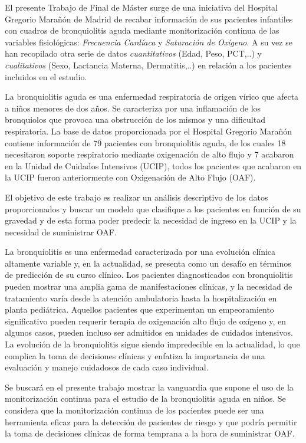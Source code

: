\documentclass[a4paper, 11pt, spanish, twoside]{article}
\begin{document}
El presente Trabajo de Final de Máster surge de una iniciativa del Hospital Gregorio Marañón de Madrid de recabar información de sus pacientes infantiles con cuadros de bronquiolitis aguda mediante monitorización continua de las variables fisiológicas: \textit{Frecuencia Cardíaca} y \textit{Saturación de Oxígeno}. A su vez se han recopilado otra serie de datos \textit{cuantitativos} (Edad, Peso, PCT,..) y \textit{cualitativos} (Sexo, Lactancia Materna, Dermatitis,..) en relación a los pacientes incluidos en el estudio. 

La bronquiolitis aguda es una enfermedad respiratoria de origen vírico que afecta a niños menores de dos años. Se caracteriza por una inflamación de los bronquiolos que provoca una obstrucción de los mismos y una dificultad respiratoria. La base de datos proporcionada por el Hospital Gregorio Marañón contiene información de 79 pacientes con bronquiolitis aguda, de los cuales 18 necesitaron soporte respiratorio mediante oxigenación de alto flujo y 7 acabaron en la Unidad de Cuidados Intensivos (UCIP), todos los pacientes que acabaron en la UCIP fueron anteriormente con Oxigenación de Alto Flujo (OAF). 

El objetivo de este trabajo es realizar un análisis descriptivo de los datos proporcionados y buscar un modelo que clasifique a los pacientes en función de su gravedad y de esta forma poder predecir la necesidad de ingreso en la UCIP y la necesidad de suministrar OAF. 

La bronquiolitis es una enfermedad caracterizada por una evolución clínica altamente variable y, en la actualidad, se presenta como un desafío en términos de predicción de su curso clínico. Los pacientes diagnosticados con bronquiolitis pueden mostrar una amplia gama de manifestaciones clínicas, y la necesidad de tratamiento varía desde la atención ambulatoria hasta la hospitalización en planta pediátrica. Aquellos pacientes que experimentan un empeoramiento significativo pueden requerir terapia de oxigenación alto flujo de oxígeno y, en algunos casos, pueden incluso ser admitidos en unidades de cuidados intensivos. La evolución de la bronquiolitis sigue siendo impredecible en la actualidad, lo que complica la toma de decisiones clínicas y enfatiza la importancia de una evaluación y manejo cuidadosos de cada caso individual.

Se buscará en el presente trabajo mostrar la vanguardia que supone el uso de la monitorización continua para el estudio de la bronquiolitis aguda en niños. Se considera que la monitorización continua de los pacientes puede ser una herramienta eficaz para la detección de pacientes de riesgo y que podría permitir la toma de decisiones clínicas de forma temprana a la hora de suministrar OAF.
\end{document}
